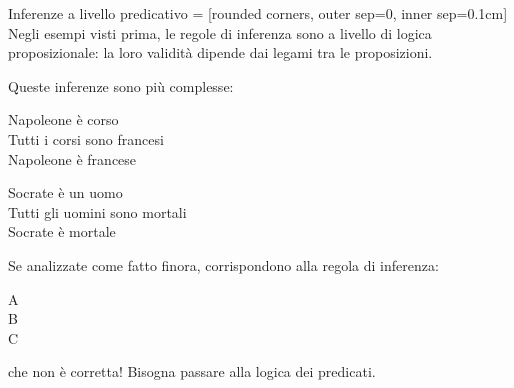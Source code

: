 \documentclass[aspectratio=169,10pt,dvipsnames,handout]{beamer}
\begin{document}
\begin{frame}{Inferenze a livello predicativo}
	 = [rounded corners, outer sep=0, inner sep=0.1cm]
	Negli esempi visti prima, le regole di inferenza sono a livello di \alert{logica proposizionale}: la loro validità dipende dai legami tra le proposizioni.

	\medskip
	Queste inferenze sono più complesse:

	\begin{center}
		\begin{inference}
			Napoleone è corso\\
			Tutti i corsi sono francesi\\
			\hline
			Napoleone è francese
		\end{inference}
		\qquad
		\begin{inference}
			Socrate è un uomo\\
			Tutti gli uomini sono mortali\\
			\hline
			Socrate è mortale
		\end{inference}
	\end{center}
	Se analizzate come fatto finora, corrispondono alla regola di inferenza:
	\begin{center}
		\begin{inference}
			A\\
			B\\
			\hline
			C
		\end{inference}
	\end{center}
	che non è corretta! Bisogna passare alla \alert{logica dei predicati}.
\end{frame}
\end{document}
